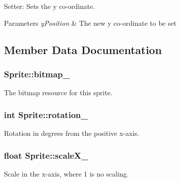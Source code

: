 Setter\-: Sets the y co-\/ordinate. 


\begin{DoxyParams}{Parameters}
{\em y\-Position} & The new y co-\/ordinate to be set \\
\hline
\end{DoxyParams}


\subsection{Member Data Documentation}
\hypertarget{class_sprite_acc220b22693eaa6ca50174b1a11a22d0}{
\subsubsection[{bitmap\-\_\-}]{ {\bf Sprite\-::bitmap\-\_\-}}}\label{class_sprite_acc220b22693eaa6ca50174b1a11a22d0}


The bitmap resource for this sprite. 

\hypertarget{class_sprite_af429cf5ba45033ece6afa3371ae1ca32}{
\subsubsection[{rotation\-\_\-}]{\setlength{\rightskip}{0pt plus 5cm}int {\bf Sprite\-::rotation\-\_\-}}}\label{class_sprite_af429cf5ba45033ece6afa3371ae1ca32}


Rotation in degrees from the positive x-\/axis. 

\hypertarget{class_sprite_aab809e2cb3503cd71f3acf00cb8bf03a}{
\subsubsection[{scale\-X\-\_\-}]{\setlength{\rightskip}{0pt plus 5cm}float {\bf Sprite\-::scale\-X\-\_\-}}}\label{class_sprite_aab809e2cb3503cd71f3acf00cb8bf03a}


Scale in the x-\/axis, where 1 is no scaling. 

